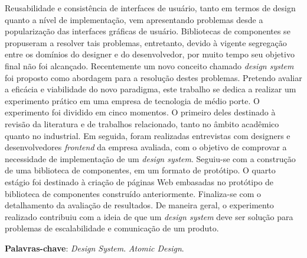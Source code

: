 
\begin{resumo}
    Reusabilidade e consistência de interfaces de usuário, tanto em termos de design quanto a nível de implementação, vem apresentando problemas desde a popularização das interfaces gráficas de usuário. Bibliotecas de componentes se propuseram a resolver tais problemas, entretanto, devido à vigente segregação entre os domínios do designer e do desenvolvedor, por muito tempo seu objetivo final não foi alcançado. Recentemente um novo conceito chamado \textit{design system} foi proposto como abordagem para a resolução destes problemas. Pretendo avaliar a eficácia e viabilidade do novo paradigma, este trabalho se dedica a realizar um experimento prático em uma empresa de tecnologia de médio porte. O experimento foi dividido em cinco momentos. O primeiro deles destinado à revisão da literatura e de trabalhos relacionado, tanto no âmbito acadêmico quanto no industrial. Em seguida, foram realizadas entrevistas com designers e desenvolvedores \textit{frontend} da empresa avaliada, com o objetivo de comprovar a necessidade de implementação de um \textit{design system}. Seguiu-se com a construção de uma biblioteca de componentes, em um formato de protótipo. O quarto estágio foi destinado à criação de páginas Web embasadas no protótipo de biblioteca de componentes construído anteriormente. Finaliza-se com o detalhamento da avaliação de resultados. De maneira geral, o experimento realizado contribuiu com a ideia de que um \textit{design system} deve ser solução para problemas de escalabilidade e comunicação de um produto.

    \textbf{Palavras-chave}: \textit{Design System}. \textit{Atomic Design}.
\end{resumo}

